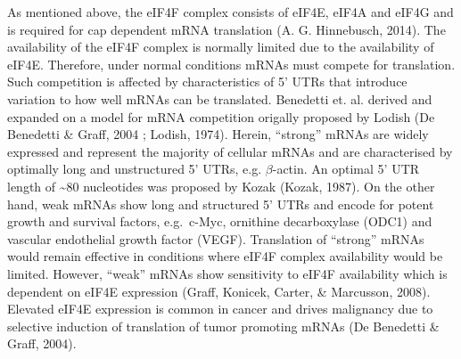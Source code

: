 \documentclass[12pt,openany]{book}
\begin{document}
As mentioned above, the eIF4F complex consists of eIF4E, eIF4A and eIF4G
and is required for cap dependent mRNA translation (A. G. Hinnebusch,
2014). The availability of the eIF4F complex is normally limited due to
the availability of eIF4E. Therefore, under normal conditions mRNAs must
compete for translation. Such competition is affected by characteristics
of 5' UTRs that introduce variation to how well mRNAs can be translated.
Benedetti et. al. derived and expanded on a model for mRNA competition
origally proposed by Lodish (De Benedetti \& Graff, 2004 ; Lodish,
1974). Herein, ``strong'' mRNAs are widely expressed and represent the
majority of cellular mRNAs and are characterised by optimally long and
unstructured 5' UTRs, e.g. \(\beta\)-actin. An optimal 5' UTR length of
\textasciitilde{}80 nucleotides was proposed by Kozak (Kozak, 1987). On
the other hand, weak mRNAs show long and structured 5' UTRs and encode
for potent growth and survival factors, e.g.~c-Myc, ornithine
decarboxylase (ODC1) and vascular endothelial growth factor (VEGF).
Translation of ``strong'' mRNAs would remain effective in conditions
where eIF4F complex availability would be limited. However, ``weak''
mRNAs show sensitivity to eIF4F availability which is dependent on eIF4E
expression (Graff, Konicek, Carter, \& Marcusson, 2008). Elevated eIF4E
expression is common in cancer and drives malignancy due to selective
induction of translation of tumor promoting mRNAs (De Benedetti \&
Graff, 2004).
\end{document}
